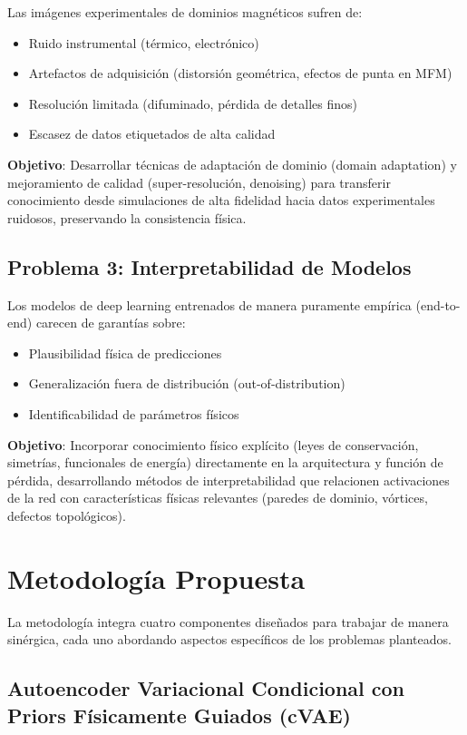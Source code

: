 \documentclass[12pt]{article}
\begin{document}
Las imágenes experimentales de dominios magnéticos sufren de:
\begin{itemize}
    \item Ruido instrumental (térmico, electrónico)
    \item Artefactos de adquisición (distorsión geométrica, efectos de punta en MFM)
    \item Resolución limitada (difuminado, pérdida de detalles finos)
    \item Escasez de datos etiquetados de alta calidad
\end{itemize}

\textbf{Objetivo}: Desarrollar técnicas de adaptación de dominio (domain adaptation) y mejoramiento de calidad (super-resolución, denoising) para transferir conocimiento desde simulaciones de alta fidelidad hacia datos experimentales ruidosos, preservando la consistencia física.

\subsection{Problema 3: Interpretabilidad de Modelos}

Los modelos de deep learning entrenados de manera puramente empírica (end-to-end) carecen de garantías sobre:
\begin{itemize}
    \item Plausibilidad física de predicciones
    \item Generalización fuera de distribución (out-of-distribution)
    \item Identificabilidad de parámetros físicos
\end{itemize}

\textbf{Objetivo}: Incorporar conocimiento físico explícito (leyes de conservación, simetrías, funcionales de energía) directamente en la arquitectura y función de pérdida, desarrollando métodos de interpretabilidad que relacionen activaciones de la red con características físicas relevantes (paredes de dominio, vórtices, defectos topológicos).

\section{Metodología Propuesta}

La metodología integra cuatro componentes diseñados para trabajar de manera sinérgica, cada uno abordando aspectos específicos de los problemas planteados.

\subsection{Autoencoder Variacional Condicional con Priors Físicamente Guiados (cVAE)}
\end{document}
